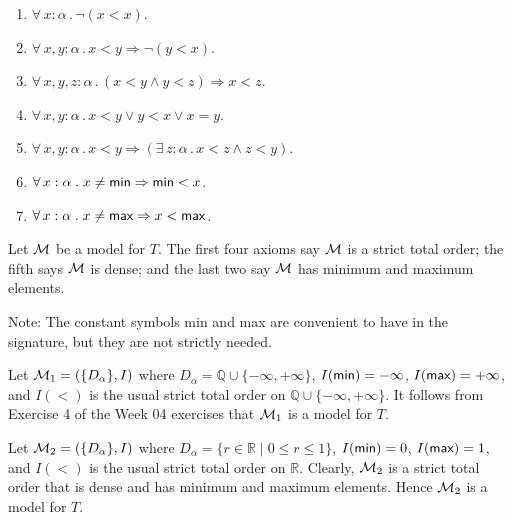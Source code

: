 \documentclass[11pt,fleqn]{article}
\newcommand{\bsp}{\begin{sloppypar}}
\newcommand{\esp}{\end{sloppypar}}
\newcommand{\mname}[1]{\mbox{\sf #1}}
\newcommand{\sM}{\mbox{$\cal M$}}
\newcommand{\set}[1]{{\{ #1 \}}}
\newcommand{\Neg}{\neg}
\renewcommand{\And}{\wedge}
\newcommand{\And}{\wedge}
\newcommand{\Or}{\vee}
\newcommand{\Implies}{\Rightarrow}
\newcommand{\ForallApp}{\forall\,}
\newcommand{\ForsomeApp}{\exists\,}
\newcommand{\mdot}{\mathrel.}
\begin{document}
  \begin{enumerate}

    \item $\ForallApp x : \alpha \mdot \Neg(x < x)$.

    \item $\ForallApp x,y : \alpha \mdot x < y \Implies \Neg(y <
      x)$.

    \item $\ForallApp x,y,z : \alpha \mdot (x < y \And y < z)
      \Implies x < z$.

    \item $\ForallApp x,y : \alpha \mdot x < y \Or y < x \Or x =
      y$.

    \item $\ForallApp x,y : \alpha \mdot x < y \Implies
      (\ForsomeApp z : \alpha \mdot x < z \And z < y)$.

    \item $\ForallApp x : \alpha \mdot x \not= \mname{min}
      \Implies \mname{min} < x$.

    \item $\ForallApp x : \alpha \mdot x \not= \mname{max}
      \Implies x < \mname{max}$.

  \end{enumerate}

  Let $\sM$ be a model for $T$.  The first four axioms say $\sM$ is a
  strict total order; the fifth says $\sM$ is dense; and the last two
  say $\sM$ has minimum and maximum elements.

  Note: The constant symbols \mname{min} and \mname{max} are
  convenient to have in the signature, but they are not strictly
  needed.

  \bsp Let $\sM_1 = (\set{D_\alpha},I)$ where $D_\alpha = \mathbb{Q}
  \cup \set{-\infty,+\infty}$, $I(\mname{min}) = -\infty$,
  $I(\mname{max}) = +\infty$, and $I(<)$ is the usual strict total
  order on $\mathbb{Q} \cup \set{-\infty,+\infty}$.  It follows from
  Exercise 4 of the Week 04 exercises that $\sM_1$ is a model for $T$.
  \esp

  Let $\sM_2 = (\set{D_\alpha},I)$ where $D_\alpha = \set{r \in
    \mathbb{R} \mid 0 \le r \le 1}$, $I(\mname{min}) = 0$,
  $I(\mname{max}) = 1$, and $I(<)$ is the usual strict total order on
  $\mathbb{R}$.  Clearly, $\sM_2$ is a strict total order that is
  dense and has minimum and maximum elements.  Hence $\sM_2$ is a
  model for $T$.

  \bigskip

\newpage
\end{document}
